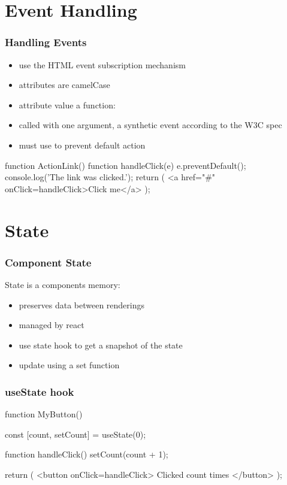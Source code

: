\section{Event Handling}
\begin{frame}[fragile] \frametitle{Handling Events}
\begin{itemize}
  \item use the HTML event subscription mechanism
  \item attributes are camelCase
  \item attribute value a function: 
  \item called with one argument, a synthetic event according to the W3C spec
  \item must use  to prevent default action
\end{itemize}
\begin{CodeBox}{}
function ActionLink() {
  function handleClick(e) {
    e.preventDefault();
    console.log('The link was clicked.');
  }
  return (
    <a href="#" onClick={handleClick}>Click me</a>
  );
}
\end{CodeBox}
\end{frame}

\section{State}
\begin{frame}[fragile] \frametitle{Component State}
State is a components memory:
  \begin{itemize}
    \item preserves data between renderings
    \item managed by react
    \item use state hook to get a snapshot of the state
    \item update using a set function
  \end{itemize}
\end{frame}

\begin{frame}[fragile] \frametitle{useState hook}
\begin{CodeBox}{}
function MyButton() {
  const [count, setCount] = useState(0);

  function handleClick() {
    setCount(count + 1);
  }

  return (
    <button onClick={handleClick}>
      Clicked {count} times
    </button>
  );
}
\end{CodeBox}
\end{frame}

